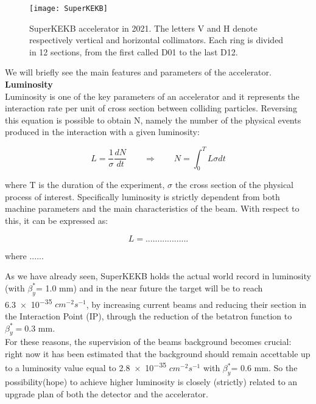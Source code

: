\begin{figure}[h!]
\centering
\texttt{[image: SuperKEKB]}
\caption{SuperKEKB accelerator in 2021. The letters V and H denote respectively vertical and horizontal collimators. Each ring is divided in 12 sections, from the first called D01 to the last D12.}
\label{fig:superkekb}
\end{figure}

We will briefly see the main features and parameters of the accelerator.\\


\textbf{Luminosity}\\

Luminosity is one of the key parameters of an accelerator and it represents the interaction rate per unit of cross section between colliding particles. Reversing this equation is possible to obtain N, namely the number of the physical events produced in the interaction with a given luminosity:

\begin{equation}
L =\frac{1}{\sigma}\frac{dN}{dt}  \qquad   \Rightarrow \qquad  N = \int_{0}^{T} L\sigma dt
\end{equation}



where T is the duration of the experiment,  $\sigma$ the cross section of the physical process of interest.
Specifically luminosity is strictly dependent from both machine parameters and the main characteristics of the beam. With respect to this, it can be expressed as:

\begin{equation}
L = ..................
\label{luminosity_eq}
\end{equation}

where ......


\hspace{.1cm}
As we have already seen, SuperKEKB holds the actual world record in luminosity (with $\beta^{*}_{y}$= 1.0 mm) and in the near future the target will be to reach \num{6.3e-35} $cm^{-2} s^{-1}$, by increasing current beams and reducing their section in the Interaction Point (IP), through the reduction of the betatron function to $\beta^{*}_{y}= 0.3$ mm.\\

For these reasons, the supervision of the beams background becomes crucial: right now it has been estimated that the background should remain accettable up to a luminosity value equal to \num{2.8e-35} $cm^{-2} s^{-1}$ with $\beta^{*}_{y}$= 0.6 mm.
So the possibility(hope) to achieve higher luminosity is closely (strictly) related to an upgrade plan of both the detector and the accelerator.

